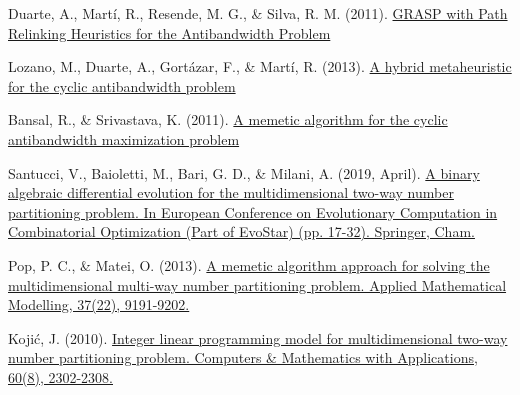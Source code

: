 \newpage


\begin{thebibliography}{9}


	Duarte, A., Martí, R., Resende, M. G., \& Silva, R. M. (2011). \href{https://onlinelibrary.wiley.com/doi/full/10.1002/net.20418}{GRASP with Path Relinking Heuristics for the Antibandwidth Problem }


	Lozano, M., Duarte, A., Gortázar, F., \& Martí, R. (2013). \href{https://www.sciencedirect.com/science/article/pii/S0950705113002621}{A hybrid metaheuristic for the cyclic antibandwidth problem}


	Bansal, R., \& Srivastava, K. (2011). \href{https://link.springer.com/article/10.1007/s00500-009-0538-6}{A memetic algorithm for the cyclic antibandwidth maximization problem}


	Santucci, V., Baioletti, M., Bari, G. D., \& Milani, A. (2019, April). \href{https://link.springer.com/chapter/10.1007/978-3-030-16711-0_2}{A binary algebraic differential evolution for the multidimensional two-way number partitioning problem. In European Conference on Evolutionary Computation in Combinatorial Optimization (Part of EvoStar) (pp. 17-32). Springer, Cham.}


	Pop, P. C., \& Matei, O. (2013). \href{https://www.researchgate.net/profile/Oliviu-Matei/publication/299673724_A_Genetic_Algorithm_Approach_for_the_Multidimensional_Two-Way_Number_Partitioning_Problem/links/620df2d5f02286737ca4cd03/A-Genetic-Algorithm-Approach-for-the-Multidimensional-Two-Way-Number-Partitioning-Problem.pdf}{A memetic algorithm approach for solving the multidimensional multi-way number partitioning problem. Applied Mathematical Modelling, 37(22), 9191-9202.}


	Kojić, J. (2010). \href{https://www.sciencedirect.com/science/article/pii/S0898122110005882}{Integer linear programming model for multidimensional two-way number partitioning problem. Computers \& Mathematics with Applications, 60(8), 2302-2308.}

\end{thebibliography}
